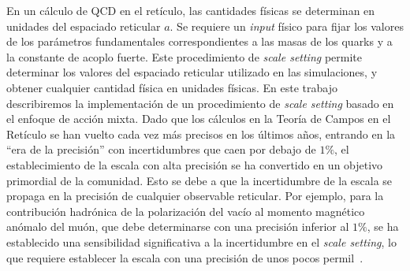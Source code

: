 En un cálculo de QCD en el retículo, las cantidades físicas se determinan en unidades del espaciado reticular $a$. Se requiere un \textit{input} físico para fijar los valores de los parámetros fundamentales correspondientes a las masas de los quarks y a la constante de acoplo fuerte. Este procedimiento de \textit{scale setting} permite determinar los valores del espaciado reticular utilizado en las simulaciones, y obtener cualquier cantidad física en unidades físicas. En este trabajo describiremos la implementación de un procedimiento de \textit{scale setting} basado en el enfoque de acción mixta. Dado que los cálculos en la Teoría de Campos en el Retículo se han vuelto cada vez más precisos en los últimos años, entrando en la ``era de la precisión'' con incertidumbres que caen por debajo de $1\%$, el establecimiento de la escala con alta precisión se ha convertido en un objetivo primordial de la comunidad. Esto se debe a que la incertidumbre de la escala se propaga en la precisión de cualquier observable reticular. Por ejemplo, para la contribución hadrónica de la polarización del vacío al momento magnético anómalo del muón, que debe determinarse con una precisión inferior al $1\%$, se ha establecido una sensibilidad significativa a la incertidumbre en el \textit{scale setting}, lo que requiere establecer la escala con una precisión de unos pocos permil~\citep{DellaMorte:2017dyu}.

